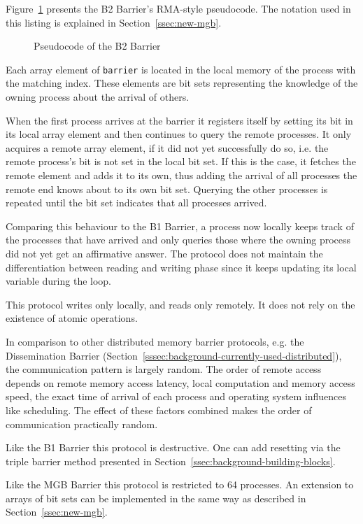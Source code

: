 \documentclass[a4paper, 10pt]{article}
\begin{document}
Figure~\ref{fig:pseudocode-b2} presents the B2 Barrier's RMA-style pseudocode. The notation used in this listing is explained in Section~\ref{ssec:new-mgb}.

\begin{figure}[htbp]
	\centering
	
	\caption{Pseudocode of the B2 Barrier}
	\label{fig:pseudocode-b2}
\end{figure}

Each array element of \texttt{barrier} is located in the local memory of the process with the matching index. These elements are bit sets representing the knowledge of the owning process about the arrival of others.

When the first process arrives at the barrier it registers itself by setting its bit in its local array element and then continues to query the remote processes. It only acquires a remote array element, if it did not yet successfully do so, i.e. the remote process's bit is not set in the local bit set. If this is the case, it fetches the remote element and adds it to its own, thus adding the arrival of all processes the remote end knows about to its own bit set. Querying the other processes is repeated until the bit set indicates that all processes arrived.

Comparing this behaviour to the B1 Barrier, a process now locally keeps track of the processes that have arrived and only queries those where the owning process did not yet get an affirmative answer.
The protocol does not maintain the differentiation between reading and writing phase since it keeps updating its local variable during the loop.

This protocol writes only locally, and reads only remotely. It does not rely on the existence of atomic operations.

In comparison to other distributed memory barrier protocols, e.g. the Dissemination Barrier (Section~\ref{sssec:background-currently-used-distributed}), the communication pattern is largely random. The order of remote access depends on remote memory access latency, local computation and memory access speed, the exact time of arrival of each process and operating system influences like scheduling. The effect of these factors combined makes the order of communication practically random.

Like the B1 Barrier this protocol is destructive. One can add resetting via the triple barrier method presented in Section~\ref{ssec:background-building-blocks}.

Like the MGB Barrier this protocol is restricted to 64 processes. An extension to arrays of bit sets can be implemented in the same way as described in Section~\ref{ssec:new-mgb}.
\end{document}
